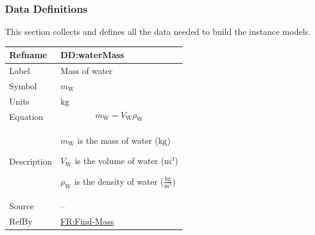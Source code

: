 \documentclass[12pt]{article}
\begin{document}
\subsubsection{Data Definitions}
\label{Sec:DDs}
This section collects and defines all the data needed to build the instance models.

\vspace{\baselineskip}
\noindent
\begin{minipage}{\textwidth}
\begin{tabular}{>{\raggedright}p{}>{\raggedright\arraybackslash}p{}}
\toprule \textbf{Refname} & \textbf{DD:waterMass}
\label{DD:waterMass}
\\ \midrule
Label & Mass of water
        
\\ \midrule
Symbol & ${m_{\text{W}}}$
         
\\ \midrule
Units & ${\text{kg}}$
        
\\ \midrule
Equation & \begin{displaymath}
           {m_{\text{W}}}={V_{\text{W}}} {ρ_{\text{W}}}
           \end{displaymath}
\\ \midrule
Description & \begin{symbDescription}
              \item{${m_{\text{W}}}$ is the mass of water (${\text{kg}}$)}
              \item{${V_{\text{W}}}$ is the volume of water (${\text{m}^{3}}$)}
              \item{${ρ_{\text{W}}}$ is the density of water ($\frac{\text{kg}}{\text{m}^{3}}$)}
              \end{symbDescription}
\\ \midrule
Source & --
         
\\ \midrule
RefBy & \hyperref[findMass]{FR:Find-Mass}
        
\\ \bottomrule
\end{tabular}
\end{minipage}
\end{document}
